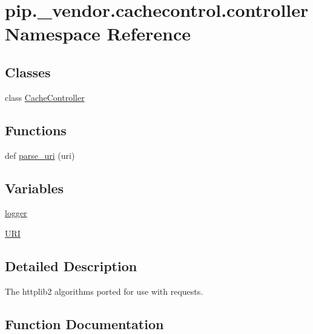 \hypertarget{namespacepip_1_1__vendor_1_1cachecontrol_1_1controller}{}\section{pip.\+\_\+vendor.\+cachecontrol.\+controller Namespace Reference}
\label{namespacepip_1_1__vendor_1_1cachecontrol_1_1controller}
\subsection*{Classes}
\begin{DoxyCompactItemize}
\item 
class \hyperlink{classpip_1_1__vendor_1_1cachecontrol_1_1controller_1_1CacheController}{Cache\+Controller}
\end{DoxyCompactItemize}
\subsection*{Functions}
\begin{DoxyCompactItemize}
\item 
def \hyperlink{namespacepip_1_1__vendor_1_1cachecontrol_1_1controller_a32f0488a331e99accfbd0e6b40b6170d}{parse\+\_\+uri} (uri)
\end{DoxyCompactItemize}
\subsection*{Variables}
\begin{DoxyCompactItemize}
\item 
\hyperlink{namespacepip_1_1__vendor_1_1cachecontrol_1_1controller_ae5e296bfc4ef86a74b58f0685cd21d84}{logger}
\item 
\hyperlink{namespacepip_1_1__vendor_1_1cachecontrol_1_1controller_ae4a3ff8b73ed94a6a378a51c0a12afc5}{U\+RI}
\end{DoxyCompactItemize}


\subsection{Detailed Description}
\begin{DoxyVerb}The httplib2 algorithms ported for use with requests.
\end{DoxyVerb}
 

\subsection{Function Documentation}
\mbox{\label{namespacepip_1_1__vendor_1_1cachecontrol_1_1controller_a32f0488a331e99accfbd0e6b40b6170d}} 
